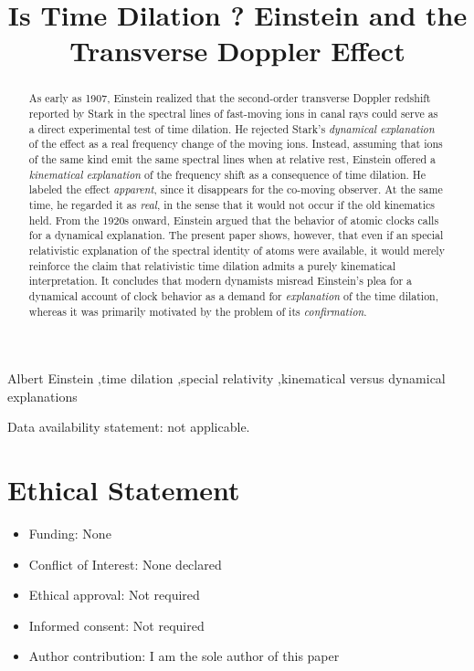 \documentclass[final,12pt,a4paper]{article}
\title{Is Time Dilation \s{Real}{}? Einstein and the Transverse Doppler Effect}
\begin{document}
\maketitle


\begin{abstract}
As early as 1907, Einstein realized that the second-order transverse Doppler redshift reported by Stark in the spectral lines of fast-moving ions in canal rays could serve as a direct experimental test of time dilation. He rejected Stark’s \emph{dynamical explanation} of the effect as a real frequency change of the moving ions. Instead, assuming that ions of the same kind emit the same spectral lines when at relative rest, Einstein offered a \emph{kinematical explanation} of the frequency shift as a consequence of time dilation. He labeled the effect \textit{apparent}, since it disappears for the co-moving observer. At the same time, he regarded it as \textit{real}, in the sense that it would not occur if the old kinematics held. From the 1920s onward, Einstein argued that the behavior of atomic clocks calls for a dynamical explanation. The present paper shows, however, that even if an special relativistic explanation of the spectral identity of atoms were available, it would merely reinforce the claim that relativistic time dilation admits a purely kinematical interpretation. It concludes that modern dynamists misread Einstein’s plea for a dynamical account of clock behavior as a demand for \emph{explanation} of the time dilation, whereas it was primarily motivated by the problem of its \emph{confirmation}.
 \end{abstract}

\begin{keywords}
Albert Einstein \sep time dilation \sep special relativity \sep kinematical versus dynamical explanations
\end{keywords}

\vspace{1cm}

\begin{center}
Data availability statement: not applicable.
\end{center}



\thispagestyle{empty}

\newpage

\section*{Ethical Statement}

\begin{itemize}
\item Funding: None
\item Conflict of Interest: None declared
\item  Ethical approval: Not required
\item Informed consent: Not required
\item Author contribution: I am the sole author of this paper

\end{itemize}
\end{document}
